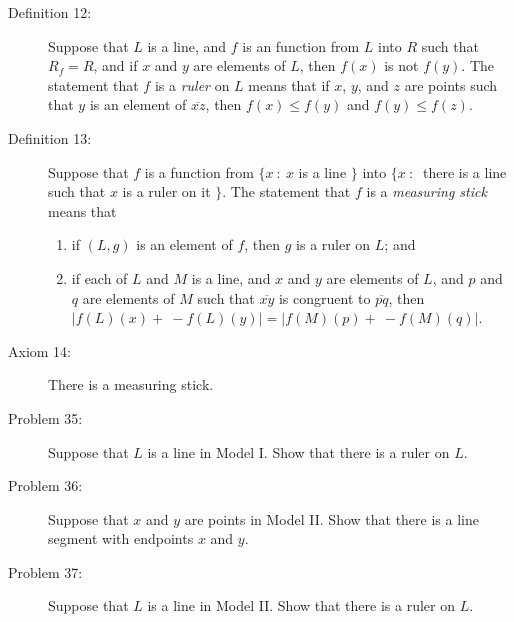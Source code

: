 \documentclass{article}
\begin{document}
\begin{description}
  \item[Definition 12:] Suppose that $L$ is a line, and $f$ is an function from $L$ into $R$ such that $R_{f} = R$, and if $x$ and $y$ are elements of $L$, then $f(x)$ is not $f(y)$. The statement that $f$ is a \emph{ruler} on $L$ means that if $x$, $y$, and $z$ are points such that $y$ is an element of $\overline{xz}$, then $f(x) \leq f(y)$ and $f(y) \leq f(z)$.

  \item[Definition 13:] Suppose that $f$ is a function from $\{ x\ :\ x$ is a line $\}$ into $\{ x\ :\ $ there is a line such that $x$ is a ruler on it $\}$. The statement that $f$ is a \emph{measuring stick} means that
    \begin{enumerate}[\hspace{1cm}(i.)]
      \item if $(L,g)$ is an element of $f$, then $g$ is a ruler on $L$; and
      \item if each of $L$ and $M$ is a line, and $x$ and $y$ are elements of $L$, and $p$ and $q$ are elements of $M$ such that $\overline{xy}$ is congruent to $\overline{pq}$, then $\vert f(L)(x) + \ -f(L)(y) \vert = \vert f(M)(p) + \ -f(M)(q) \vert$.
    \end{enumerate}

  \item[Axiom 14:] There is a measuring stick.

  \item[Problem 35:] Suppose that $L$ is a line in Model I. Show that there is a ruler on $L$.

  \item[Problem 36:] Suppose that $x$ and $y$ are points in Model II. Show that there is a line segment with endpoints $x$ and $y$.

  \item[Problem 37:] Suppose that $L$ is a line in Model II. Show that there is a ruler on $L$.

\end{description}
\end{document}
